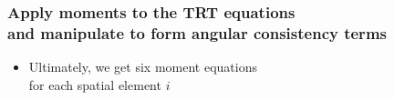 \documentclass[xcolor=dvipsnames,hyperref={pdfpagelabels=false},unknownkeysallowed]{beamer}
\newcommand{\highlight}[1]{%
    \colorbox{myblue!50}{\ensuremath{\displaystyle#1}}}
\newcommand{\ds}[0]{\displaystyle}
\newcommand{\colb}[1]{{\color{blue} #1}}
\newcommand{\colG}[1]{{\color{Gray!110} #1}}
\newlength{\wideitemsep}
\let\olditem\item
\renewcommand{\item}{\setlength{\itemsep}{\wideitemsep}\olditem}
\newcommand{\pderiv}[2]{\frac{\partial #1}{\partial #2}}
\newcommand{\mom}[1]{\langle #1 \rangle}
\begin{document}
\begin{frame}
    \frametitle{Apply moments to the TRT equations \\ and manipulate to form
        \colb{angular consistency
    terms}}
    {\addtolength{\leftmargini}{-0.02cm}
    \begin{itemize}
    \item[] Ultimately, we get six  moment equations
             \\ \colG{for each spatial element $i$}


\end{itemize}}
\end{frame}
\end{document}
